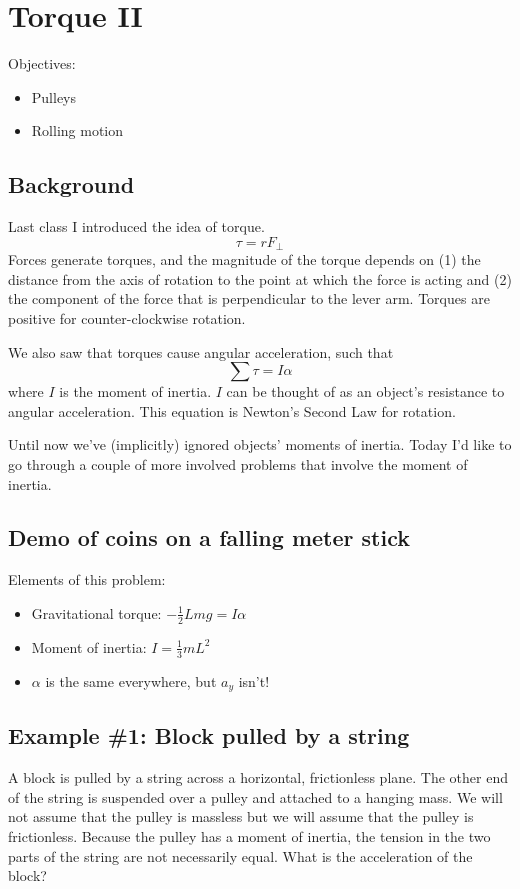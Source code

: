 \section{Torque II}
Objectives:
\begin{itemize}
\item Pulleys
\item Rolling motion
\end{itemize}

\subsection{Background}
Last class I introduced the idea of torque.
$$\tau=rF_\perp$$
Forces generate torques, and the magnitude of the torque depends on (1) the distance from the axis of rotation to the point at which the force is acting and (2) the component of the force that is perpendicular to the lever arm. Torques are positive for counter-clockwise rotation.

We also saw that torques cause angular acceleration, such that
$$\sum \tau=I\alpha$$
where $I$ is the moment of inertia. $I$ can be thought of as an object's resistance to angular acceleration. This equation is Newton's Second Law for rotation.

Until now we've (implicitly) ignored objects' moments of inertia. Today I'd like to go through a couple of more involved problems that involve the moment of inertia.

\subsection{Demo of coins on a falling meter stick}
Elements of this problem:
\begin{itemize}
\item Gravitational torque: $-\frac{1}{2}Lmg = I\alpha$
\item Moment of inertia: $I = \frac{1}{3}mL^2$
\item $\alpha$ is the same everywhere, but $a_y$ isn't!
\end{itemize}



\subsection{Example \#1: Block pulled by a string}
A block is pulled by a string across a horizontal, frictionless plane. The other end of the string is suspended over a pulley and attached to a hanging mass. We will not assume that the pulley is massless but we will assume that the pulley is frictionless. Because the pulley has a moment of inertia, the tension in the two parts of the string are not necessarily equal. What is the acceleration of the block?

